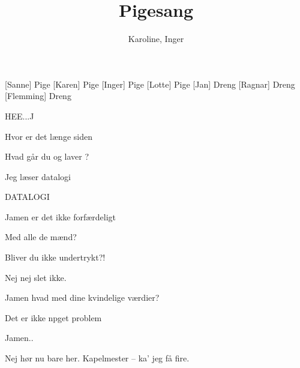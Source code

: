 \documentclass[a4paper,11pt]{article}
\title{Pigesang}
\author{Karoline, Inger}
\begin{document}
\maketitle

\begin{roles}
[Sanne] Pige
[Karen] Pige
[Inger] Pige
[Lotte] Pige
[Jan] Dreng
[Ragnar] Dreng
[Flemming] Dreng
\end{roles}

\begin{sketch}

 HEE...J

 Hvor er det længe siden

 Hvad går du og laver ?

 Jeg læser datalogi

 DATALOGI

 Jamen er det ikke forfærdeligt

 Med alle de mænd?

 Bliver du ikke undertrykt?!

 Nej nej slet ikke.

 Jamen hvad med dine kvindelige værdier?

 Det er ikke npget problem

 Jamen..

 Nej hør nu bare her. Kapelmester -- ka' jeg få fire.


\end{sketch}
\end{document}
